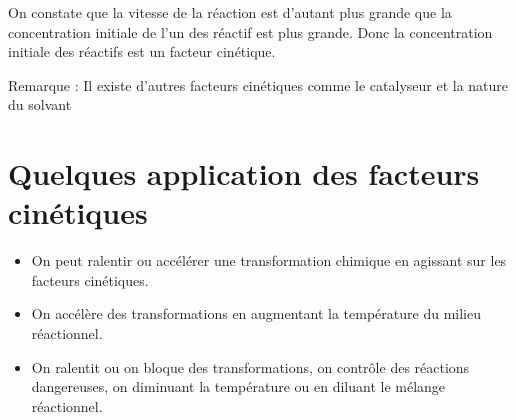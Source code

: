 \documentclass[12pt]{article}
\begin{document}
On constate que la vitesse de la réaction est d'autant plus grande que la concentration initiale de l'un des réactif est plus grande.
Donc la concentration initiale des réactifs est un facteur cinétique.

Remarque : Il existe d'autres facteurs cinétiques comme le catalyseur et la nature du solvant

\section{Quelques application des facteurs cinétiques}
\begin{itemize}
	\item On peut ralentir ou accélérer une transformation chimique en agissant sur les facteurs cinétiques.
	\item On accélère des transformations en augmentant la température du milieu réactionnel.
	\item On ralentit ou on bloque des transformations, on contrôle des réactions dangereuses, on diminuant la température ou en diluant le mélange réactionnel.
\end{itemize}
\end{document}
